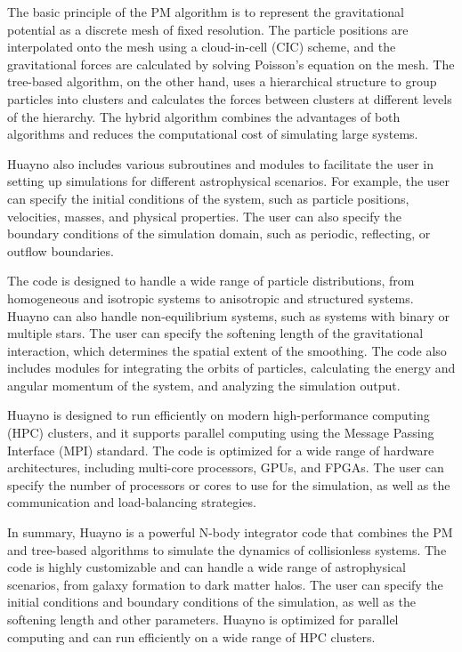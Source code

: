 The basic principle of the PM algorithm is to represent the gravitational potential as a discrete mesh of fixed resolution. The particle positions are interpolated onto the mesh using a cloud-in-cell (CIC) scheme, and the gravitational forces are calculated by solving Poisson's equation on the mesh. The tree-based algorithm, on the other hand, uses a hierarchical structure to group particles into clusters and calculates the forces between clusters at different levels of the hierarchy. The hybrid algorithm combines the advantages of both algorithms and reduces the computational cost of simulating large systems.

Huayno also includes various subroutines and modules to facilitate the user in setting up simulations for different astrophysical scenarios. For example, the user can specify the initial conditions of the system, such as particle positions, velocities, masses, and physical properties. The user can also specify the boundary conditions of the simulation domain, such as periodic, reflecting, or outflow boundaries.

The code is designed to handle a wide range of particle distributions, from homogeneous and isotropic systems to anisotropic and structured systems. Huayno can also handle non-equilibrium systems, such as systems with binary or multiple stars. The user can specify the softening length of the gravitational interaction, which determines the spatial extent of the smoothing. The code also includes modules for integrating the orbits of particles, calculating the energy and angular momentum of the system, and analyzing the simulation output.

Huayno is designed to run efficiently on modern high-performance computing (HPC) clusters, and it supports parallel computing using the Message Passing Interface (MPI) standard. The code is optimized for a wide range of hardware architectures, including multi-core processors, GPUs, and FPGAs. The user can specify the number of processors or cores to use for the simulation, as well as the communication and load-balancing strategies.

In summary, Huayno is a powerful N-body integrator code that combines the PM and tree-based algorithms to simulate the dynamics of collisionless systems. The code is highly customizable and can handle a wide range of astrophysical scenarios, from galaxy formation to dark matter halos. The user can specify the initial conditions and boundary conditions of the simulation, as well as the softening length and other parameters. Huayno is optimized for parallel computing and can run efficiently on a wide range of HPC clusters.